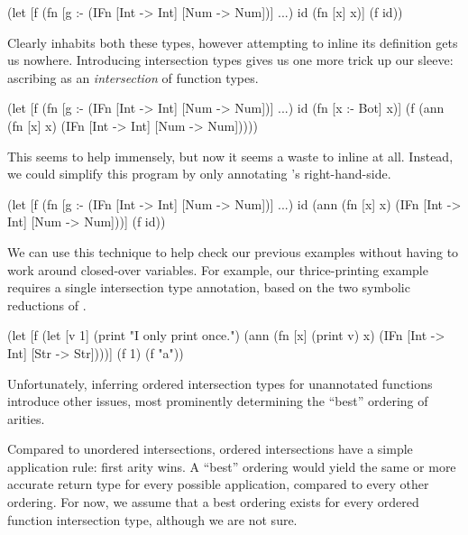 \begin{cljlisting}
(let [f (fn [g :- (IFn [Int -> Int] [Num -> Num])] ...)
      id (fn [x] x)]
  (f id))
\end{cljlisting}

Clearly  inhabits both these types,
however attempting to inline its definition
gets us nowhere.
Introducing intersection types gives us
one more trick up our sleeve: ascribing
 as an \emph{intersection} of function types.

\begin{cljlisting}
(let [f (fn [g :- (IFn [Int -> Int] [Num -> Num])] ...)
      id (fn [x :- Bot] x)]
  (f (ann (fn [x] x)
          (IFn [Int -> Int]
               [Num -> Num]))))
\end{cljlisting}

This seems to help immensely, but now it seems a waste
to inline  at all.
Instead, we could simplify this program by only annotating 's
right-hand-side.

\begin{cljlisting}
(let [f (fn [g :- (IFn [Int -> Int] [Num -> Num])] ...)
      id (ann (fn [x] x)
              (IFn [Int -> Int]
                   [Num -> Num]))]
  (f id))
\end{cljlisting}

We can use this technique to help check our previous examples
without having to work around closed-over variables.
For example, our thrice-printing example requires
a single intersection type annotation, based on
the two symbolic reductions of .

\begin{cljlisting}
(let [f (let [v 1]
          (print "I only print once.")
          (ann (fn [x] (print v) x)
               (IFn [Int -> Int]
                    [Str -> Str])))]
  (f 1)
  (f "a"))
\end{cljlisting}

Unfortunately, inferring ordered intersection types for unannotated
functions introduce other issues,
most prominently determining the ``best'' ordering of
arities.

Compared to unordered intersections, ordered intersections
have a simple application rule: first arity wins.
A ``best'' ordering would yield the same or more accurate return type
for every possible application, compared to every other ordering.
For now, we assume that a best ordering
exists for every ordered function intersection type, although
we are not sure.


